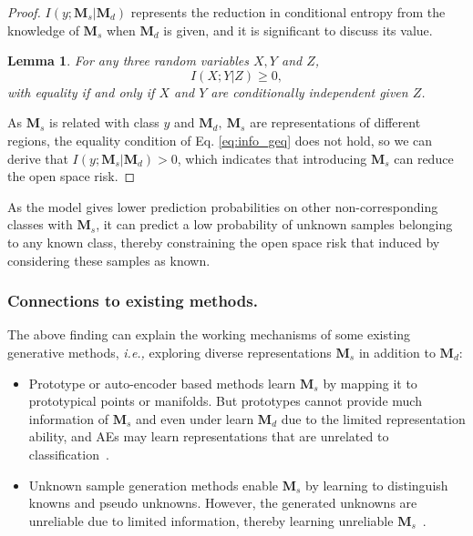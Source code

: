 \documentclass[letterpaper]{article} %
\newtheorem{lemma}{Lemma}
\begin{document}
\begin{proof}
$I(y;\boldsymbol{M}_s|\boldsymbol{M}_d)$ represents the reduction in conditional entropy from the knowledge of $\boldsymbol{M}_s$ when $\boldsymbol{M}_d$ is given, and it is significant to discuss its value.
\begin{lemma} \cite{cover2012elements}
For any three random variables $X,Y$ and $Z$,
\begin{equation}
I(X;Y|Z)\geq0,
\label{eq:info_geq}
\end{equation}
with equality if and only if $X$ and $Y$ are conditionally independent given $Z$.
\end{lemma}

As $\boldsymbol{M}_s$ is related with class $y$ and $\boldsymbol{M}_d,\ \boldsymbol{M}_s$ are representations of different regions, the equality condition of Eq. \eqref{eq:info_geq} does not hold, so we can derive that $I(y;\boldsymbol{M}_s|\boldsymbol{M}_d)>0$, which indicates that introducing $\boldsymbol{M}_s$ can reduce the open space risk.
\end{proof}

As the model gives lower prediction probabilities on other non-corresponding classes with $\boldsymbol{M}_s$, it can predict a low probability of unknown samples belonging to any known class, thereby constraining the open space risk that induced by considering these samples as known.

\subsubsection{Connections to existing methods.}
The above finding can explain the working mechanisms of some existing generative methods, \emph{i.e.,} exploring diverse representations $\boldsymbol{M}_s$ in addition to $\boldsymbol{M}_d$:
\begin{itemize}
    \item Prototype or auto-encoder based methods learn $\boldsymbol{M}_s$ by mapping it to prototypical points or manifolds. But prototypes cannot provide much information of $\boldsymbol{M}_s$ and even under learn $\boldsymbol{M}_d$ due to the limited representation ability, and AEs may learn representations that are unrelated to classification~\cite{huang2023class}.
    \item Unknown sample generation methods enable $\boldsymbol{M}_s$ by learning to distinguish knowns and pseudo unknowns. However, the generated unknowns are unreliable due to limited information, thereby learning unreliable $\boldsymbol{M}_s$~\cite{kong2022opengan}.
\end{itemize}
\end{document}

